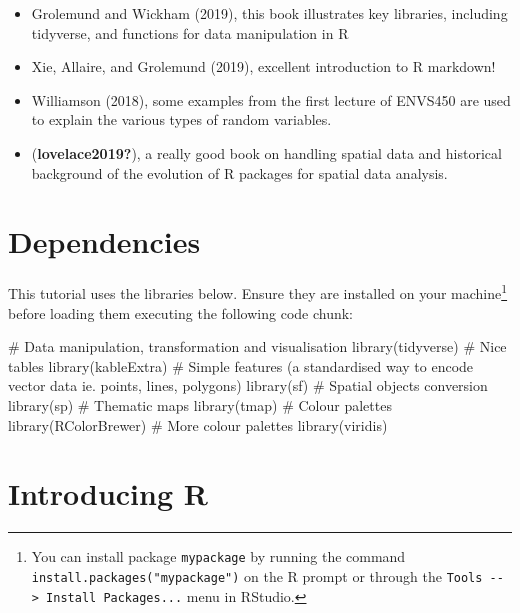 \documentclass[
  letterpaper,
  krantz2]{style/krantz}
\newenvironment{Shaded}{\begin{snugshade}}{\end{snugshade}}
\newcommand{\CommentTok}[1]{\textcolor[rgb]{0.37,0.37,0.37}{#1}}
\newcommand{\FunctionTok}[1]{\textcolor[rgb]{0.28,0.35,0.67}{#1}}
\newcommand{\NormalTok}[1]{\textcolor[rgb]{0.00,0.23,0.31}{#1}}
\begin{document}
\begin{itemize}
\item
  Grolemund and Wickham (2019), this book illustrates key libraries,
  including tidyverse, and functions for data manipulation in R
\item
  Xie, Allaire, and Grolemund (2019), excellent introduction to R
  markdown!
\item
  Williamson (2018), some examples from the first lecture of ENVS450 are
  used to explain the various types of random variables.
\item
  (\textbf{lovelace2019?}), a really good book on handling spatial data
  and historical background of the evolution of R packages for spatial
  data analysis.
\end{itemize}

\hypertarget{dependencies}{%
\section{Dependencies}\label{dependencies}}

This tutorial uses the libraries below. Ensure they are installed on
your machine\footnote{You can install package \texttt{mypackage} by
  running the command \texttt{install.packages("mypackage")} on the R
  prompt or through the
  \texttt{Tools\ -\/-\textgreater{}\ Install\ Packages...} menu in
  RStudio.} before loading them executing the following code chunk:

\begin{Shaded}
\begin{Highlighting}[]
\CommentTok{\# Data manipulation, transformation and visualisation}
\FunctionTok{library}\NormalTok{(tidyverse)}
\CommentTok{\# Nice tables}
\FunctionTok{library}\NormalTok{(kableExtra)}
\CommentTok{\# Simple features (a standardised way to encode vector data ie. points, lines, polygons)}
\FunctionTok{library}\NormalTok{(sf) }
\CommentTok{\# Spatial objects conversion}
\FunctionTok{library}\NormalTok{(sp) }
\CommentTok{\# Thematic maps}
\FunctionTok{library}\NormalTok{(tmap) }
\CommentTok{\# Colour palettes}
\FunctionTok{library}\NormalTok{(RColorBrewer) }
\CommentTok{\# More colour palettes}
\FunctionTok{library}\NormalTok{(viridis)}
\end{Highlighting}
\end{Shaded}

\hypertarget{introducing-r}{%
\section{Introducing R}\label{introducing-r}}
\end{document}
